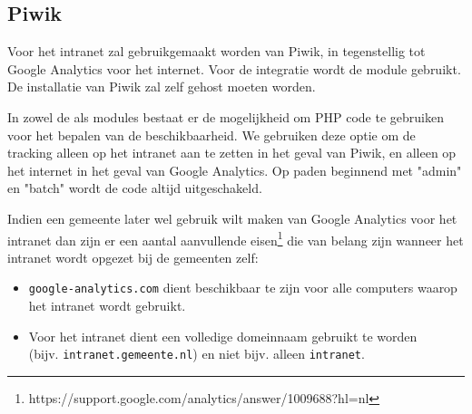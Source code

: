 \subsection{Piwik}\label{analyticsintranet}

Voor het intranet zal gebruikgemaakt worden van Piwik, in tegenstellig tot Google Analytics voor het internet. Voor de integratie wordt de  module gebruikt. De installatie van Piwik zal zelf gehost moeten worden.

In zowel de  als  modules bestaat er de mogelijkheid om PHP code te gebruiken voor het bepalen van de beschikbaarheid. We gebruiken deze optie om de tracking alleen op het intranet aan te zetten in het geval van Piwik, en alleen op het internet in het geval van Google Analytics. Op paden beginnend met "admin" en "batch" wordt de code altijd uitgeschakeld.

Indien een gemeente later wel gebruik wilt maken van Google Analytics voor het intranet dan zijn er een aantal aanvullende eisen\footnote{https://support.google.com/analytics/answer/1009688?hl=nl} die van belang zijn wanneer het intranet wordt opgezet bij de gemeenten zelf:
\begin{itemize}
\item \texttt{google-analytics.com} dient beschikbaar te zijn voor alle computers waarop het intranet wordt gebruikt.
\item Voor het intranet dient een volledige domeinnaam gebruikt te worden \\ (bijv. \texttt{intranet.gemeente.nl}) en niet bijv. alleen \texttt{intranet}.
\end{itemize}
